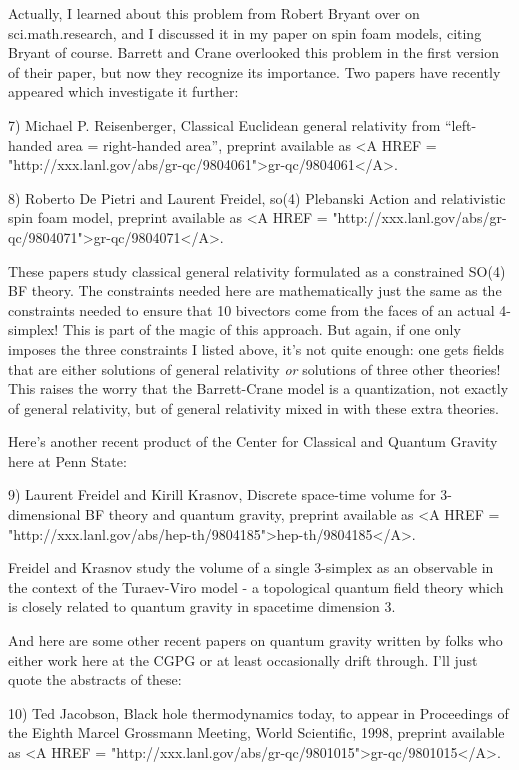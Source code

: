 Actually, I learned about this problem from Robert Bryant over on
sci.math.research, and I discussed it in my paper on spin foam models,
citing Bryant of course.  Barrett and Crane overlooked this problem in
the first version of their paper, but now they recognize its
importance.  Two papers have recently appeared which investigate it
further:

7) Michael P. Reisenberger, Classical Euclidean general relativity from 
``left-handed area = right-handed area'', preprint available as 
<A HREF = "http://xxx.lanl.gov/abs/gr-qc/9804061">gr-qc/9804061</A>.

8) Roberto De Pietri and Laurent Freidel, so(4) Plebanski Action and 
relativistic spin foam model, preprint available as <A HREF = "http://xxx.lanl.gov/abs/gr-qc/9804071">gr-qc/9804071</A>.

These papers study classical general relativity formulated as a
constrained SO(4) BF theory.  The constraints needed here are
mathematically just the same as the constraints needed to ensure that
10 bivectors come from the faces of an actual 4-simplex!  This is part
of the magic of this approach.  But again, if one only imposes the
three constraints I listed above, it's not quite enough: one gets
fields that are either solutions of general relativity \emph{or} solutions
of three other theories!  This raises the worry that the Barrett-Crane
model is a quantization, not exactly of general relativity, but of
general relativity mixed in with these extra theories.  

Here's another recent product of the Center for Classical and
Quantum Gravity here at Penn State:

9) Laurent Freidel and Kirill Krasnov, Discrete space-time volume for 
3-dimensional BF theory and quantum gravity, preprint available as
<A HREF = "http://xxx.lanl.gov/abs/hep-th/9804185">hep-th/9804185</A>.

Freidel and Krasnov study the volume of a single 3-simplex as an
observable in the context of the Turaev-Viro model - a topological
quantum field theory which is closely related to quantum gravity in
spacetime dimension 3.   

And here are some other recent papers on quantum gravity written by
folks who either work here at the CGPG or at least occasionally
drift through.   I'll just quote the abstracts of these:

10) Ted Jacobson, Black hole thermodynamics today, to appear in Proceedings
of the Eighth Marcel Grossmann Meeting, World Scientific, 1998, preprint
available as <A HREF = "http://xxx.lanl.gov/abs/gr-qc/9801015">gr-qc/9801015</A>.  

